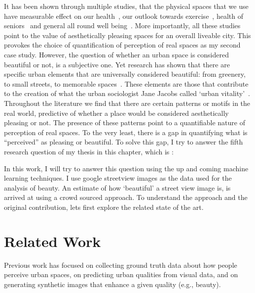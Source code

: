 It has been shown through multiple studies, that the physical spaces that we use have measurable effect on our health~\cite{maas2006green,lee2011health}, our outlook towards exercise~\cite{tamosiunas2014accessibility}, health of seniors~\cite{takano2002urban} and general all round well being~\cite{gascon2015mental,nutsford2013ecological}. More importantly, all these studies point to the value of aesthetically pleasing spaces for an overall liveable city. This provokes the choice of quantification of perception of real spaces as my second case study. 
However, the question of whether an urban space is considered beautiful or not, is a subjective one. Yet research has shown that there are specific urban elements that are universally considered beautiful: from greenery, to small streets, to memorable spaces~\cite{alexander1977pattern, quercia2014aesthetic,salesses2013collaborative}. These elements are those that contribute to the creation of what the urban sociologist Jane Jacobs called `urban vitality'~\cite{jacobs1961death}. Throughout the literature we find that there are certain patterns or motifs in the real world, predictive of whether a place would be considered aesthetically pleasing or not. The presence of these patterns point to a quantifiable nature of perception of real spaces. To the very least, there is a gap in quantifying what is ``perceived'' as pleasing or beautiful. To solve this gap, I try to answer the fifth research question of my thesis in this chapter, which is : 
\noindent{}

In this work, I will try to answer this question using the up and coming machine learning techniques. I use google streetview images as the data used for the analysis of beauty. An estimate of how `beautiful' a street view image is, is arrived at using a crowd sourced approach. To understand the approach and the original contribution, lets first  explore the related state of the art.

\section{Related Work}
\label{sec:related}
Previous work has focused on collecting ground truth data about how people perceive urban spaces, on predicting urban qualities from visual data, and on generating synthetic images that enhance a given quality (e.g., beauty). 

